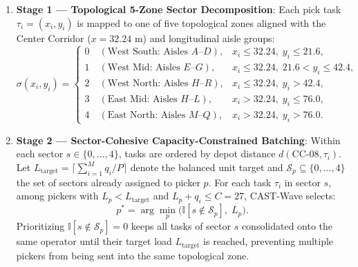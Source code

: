 \documentclass[11pt,a4paper]{article}
\begin{document}
\begin{enumerate}[leftmargin=*]
    \item \textbf{Stage 1 --- Topological 5-Zone Sector Decomposition}:
    Each pick task $\tau_i = (x_i, y_i)$ is mapped to one of five topological zones aligned with the Center Corridor ($x = 32.24\text{ m}$) and longitudinal aisle groups:
    \begin{equation}
        \sigma(x_i, y_i) = \begin{cases}
            0 \quad (\text{West South: Aisles } A\text{--}D), & x_i \le 32.24, \; y_i \le 21.6, \\
            1 \quad (\text{West Mid: Aisles } E\text{--}G), & x_i \le 32.24, \; 21.6 < y_i \le 42.4, \\
            2 \quad (\text{West North: Aisles } H\text{--}R), & x_i \le 32.24, \; y_i > 42.4, \\
            3 \quad (\text{East Mid: Aisles } H\text{--}L), & x_i > 32.24, \; y_i \le 76.0, \\
            4 \quad (\text{East North: Aisles } M\text{--}Q), & x_i > 32.24, \; y_i > 76.0.
        \end{cases}
    \end{equation}

    \item \textbf{Stage 2 --- Sector-Cohesive Capacity-Constrained Batching}:
    Within each sector $s \in \{0, \dots, 4\}$, tasks are ordered by depot distance $d(\text{CC-08}, \tau_i)$. Let $L_{\text{target}} = \lceil \sum_{i=1}^M q_i / P \rceil$ denote the balanced unit target and $\mathcal{S}_p \subseteq \{0, \dots, 4\}$ the set of sectors already assigned to picker $p$. For each task $\tau_i$ in sector $s$, among pickers with $L_p < L_{\text{target}}$ and $L_p + q_i \le C = 27$, CAST-Wave selects:
    \begin{equation}
        p^* = \arg\min_{p} \Big( \mathbb{I}[s \notin \mathcal{S}_p], \; L_p \Big).
    \end{equation}
    Prioritizing $\mathbb{I}[s \notin \mathcal{S}_p] = 0$ keeps all tasks of sector $s$ consolidated onto the same operator until their target load $L_{\text{target}}$ is reached, preventing multiple pickers from being sent into the same topological zone.


\end{enumerate}
\end{document}
